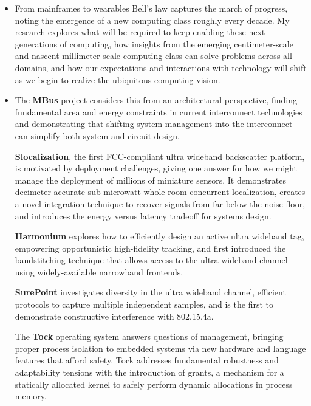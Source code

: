 \documentclass{article}
\begin{document}
\begin{itemize}
  \item[]
    From mainframes to wearables Bell's law captures the march of progress,
    noting the emergence of a new computing class roughly every decade.  My
    research explores what will be required to keep enabling these next
    generations of computing, how insights from the emerging centimeter-scale
    and nascent millimeter-scale computing class can solve problems across all
    domains, and how our expectations and interactions with technology will
    shift as we begin to realize the ubiquitous computing vision.

  \item[]
    The \textbf{MBus} project considers this from an architectural
    perspective, finding fundamental area and energy constraints in current
    interconnect technologies and demonstrating that shifting system
    management into the interconnect can simplify both system and circuit
    design.

    \textbf{Slocalization}, the first FCC-compliant ultra wideband backscatter
    platform, is motivated by deployment challenges, giving one answer for how
    we might manage the deployment of millions of miniature sensors.  It
    demonstrates decimeter-accurate sub-microwatt whole-room concurrent
    localization, creates a novel integration technique to recover signals
    from far below the noise floor, and introduces the energy versus latency
    tradeoff for systems design.

    \textbf{Harmonium} explores how to efficiently design an active ultra
    wideband tag, empowering opportunistic high-fidelity tracking, and first
    introduced the bandstitching technique that allows access to the ultra
    wideband channel using widely-available narrowband frontends.

    \textbf{SurePoint} investigates diversity in the ultra wideband channel,
    efficient protocols to capture multiple independent samples, and is the
    first to demonstrate constructive interference with 802.15.4a.

    The \textbf{Tock} operating system answers questions of management,
    bringing proper process isolation to embedded systems via new hardware and
    language features that afford safety. Tock addresses fundamental
    robustness and adaptability tensions with the introduction of grants, a
    mechanism for a statically allocated kernel to safely perform dynamic
    allocations in process memory.


\end{itemize}
\end{document}
